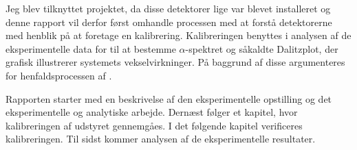 Jeg blev tilknyttet projektet, da disse detektorer lige var blevet installeret og denne rapport vil
derfor først omhandle processen med at forstå detektorerne med henblik på at foretage
en kalibrering. Kalibreringen benyttes i analysen af de eksperimentelle data for \Carb til at
bestemme $\alpha$-spektret og såkaldte Dalitzplot, der grafisk illustrerer systemets vekselvirkninger. På
baggrund af disse argumenteres for henfaldsprocessen af \Carb.

Rapporten starter med en beskrivelse af den eksperimentelle opstilling og det eksperimentelle og
analytiske arbejde. Dernæst følger et kapitel, hvor kalibreringen af udstyret gennemgåes. I det
følgende kapitel verificeres kalibreringen. Til sidst kommer analysen af de eksperimentelle
resultater.






